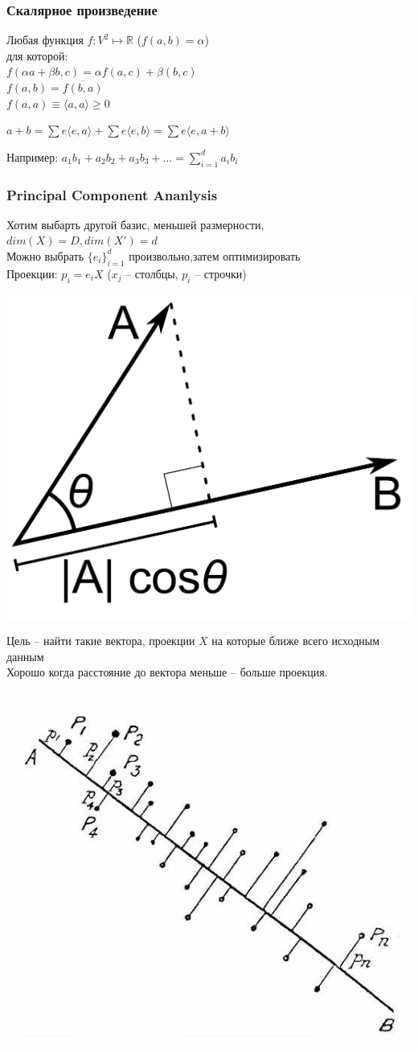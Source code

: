 \documentclass[14pt]{beamer}
\begin{document}
\begin{frame}
\frametitle{Скалярное произведение}
	Любая функция $f: V^2 \mapsto \mathbb{R}$ ($f(a,b)=\alpha$)\\
	для которой:\\
	\pause
	$f(\alpha a+\beta b,c)=\alpha f(a,c) +\beta(b,c)$\\
	$f(a,b)=\overline{f(b,a)}$\\
	$f(a,a)\equiv\langle a,a\rangle \geq0$\\
	\begin{center}
	$	a+b=\sum e\langle e,a \rangle +\sum e\langle e,b \rangle=
	\sum e\langle e,a +b \rangle$
	\end{center}
	Например: $a_1b_1 + a_2b_2 + a_3b_3 + ...= \sum_{i=1}^d a_ib_i$
\end{frame}

\begin{frame}
\frametitle{Principal Component Ananlysis}
	Хотим выбарть другой базис, меньшей размерности, $dim(X)=D, dim(X')=d$\\
	Можно выбрать $\{e_i\}_{i=1}^d$ произвольно,затем оптимизировать \\
	Проекции: $p_i=e_iX$ ($x_j$ -- столбцы, $p_i$ -- строчки)\\
	\begin{center}
  \includegraphics[width=0.4\linewidth]{project.png}\\
	\end{center}
\end{frame}
\begin{frame}
	Цель -- найти такие вектора, проекции $X$ на которые ближе всего исходным данным\\
	Хорошо когда расстояние до вектора меньше -- больше проекция.\\
	\begin{center}
	  \includegraphics[width=0.45\linewidth]{pearson.jpg}\\
	\end{center}
\end{frame}
\end{document}
